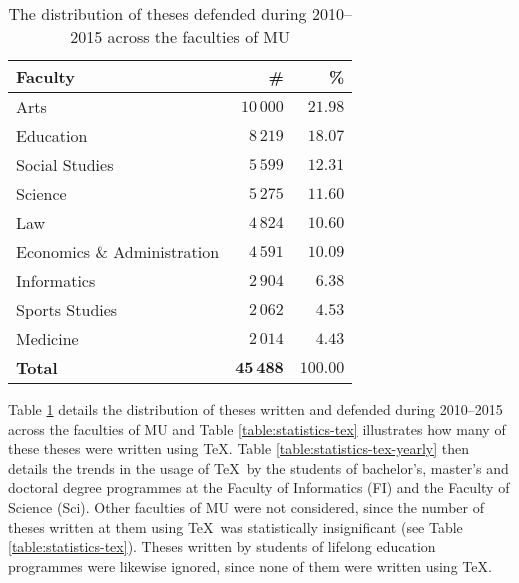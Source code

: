 \documentclass{csbulletin}
\begin{document}
{  \begin{table}
    \begin{tabularx}{\textwidth}{Xrr}
      \textbf{Faculty} & \textbf{\#} & \textbf{\%} \\
      \toprule
      Arts                         & $10\,000$ & $21.98$ \\%
      Education                    & $8\,219$  & $18.07$ \\%
      Social Studies               & $5\,599$  & $12.31$ \\%
      Science                      & $5\,275$  & $11.60$ \\%
      Law                          & $4\,824$  & $10.60$ \\%
      Economics \& Administration  & $4\,591$  & $10.09$ \\%
      Informatics                  & $2\,904$  &  $6.38$ \\%
      Sports Studies               & $2\,062$  &  $4.53$ \\%
      Medicine                     & $2\,014$  &  $4.43$ \\%
      \bottomrule
      \textbf{Total}     & $\mathbf{45\,488}$ & $\mathbf{100.00}$
    \end{tabularx}
    \caption{The distribution of theses defended during 2010--2015
      across the faculties of MU}
    \label{table:statistics-faculty}
  \end{table}

  Table \ref{table:statistics-faculty} details the distribution of
  theses written and defended during 2010--2015 across the
  faculties of MU and Table \ref{table:statistics-tex} illustrates
  how many of these theses were written using \TeX. Table
  \ref{table:statistics-tex-yearly} then details the trends in the
  usage of \TeX\ by the students of bachelor's, master's and
  doctoral degree programmes at the Faculty of Informatics (FI) and
  the Faculty of Science (Sci).  Other faculties of MU were not
  considered, since the number of theses written at them using
  \TeX\ was statistically insignificant (see Table
  \ref{table:statistics-tex}). Theses written by students of
  lifelong education programmes were likewise ignored, since none
  of them were written using \TeX.

}
\end{document}
